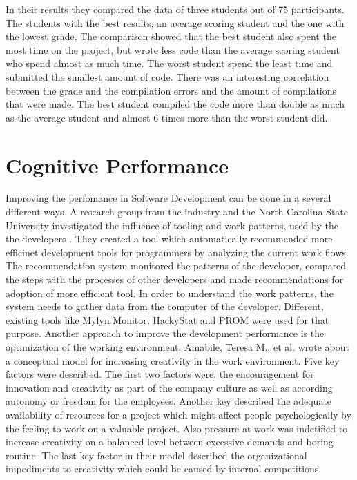 In their results they compared the data of three students out of 75 participants. The students with the best results, an average scoring student and the one with the lowest grade. 
The comparison showed that the best student also spent the most time on the project, but wrote less code than the average scoring student who spend almost as much time. The worst student spend the least time and submitted the smallest amount of code. There was an interesting correlation between the grade and the compilation errors and the amount of compilations that were made. The best student compiled the code more than double as much as the average student and almost 6 times more than the worst student did. \cite{norris2008clockit}

\section{Cognitive Performance}
Improving the perfomance in Software Development can be done in a several different ways. A research group from the industry and the North Carolina State University investigated the influence of tooling and work patterns, used by the the developers \cite{snipes2013towards}. They created a tool which automatically recommended more efficinet development tools for programmers by analyzing the current work flows. The recommendation system monitored the patterns of the developer, compared the steps with the processes of other developers and made recommendations for adoption of more efficient tool.
In order to understand the work patterns, the system needs to gather data from the computer of the developer. Different, existing tools like Mylyn Monitor, HackyStat and PROM were used for that purpose.
Another approach to improve the development performance is the optimization of the working environment. Amabile, Teresa M., et al. \cite{amabile1996assessing} wrote about a conceptual model for increasing creativity in the work environment. Five key factors were described. The first two factors were, the encouragement for innovation and creativity as part of the company culture as well as according autonomy or freedom for the employees. Another key described the adequate availability of resources for a project which might affect people psychologically by the feeling to work on a valuable project. Also pressure at work was indetified to increase creativity on a balanced level between excessive demands and boring routine. The last key factor in their model described the organizational impediments to creativity which could be caused by internal competitions.
